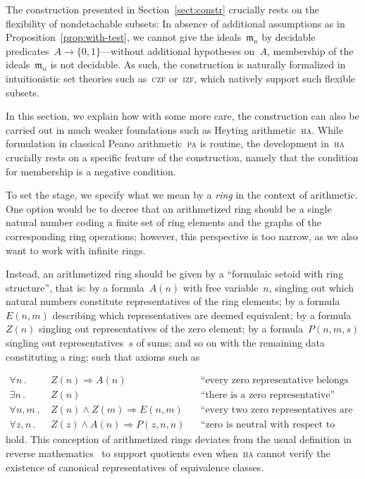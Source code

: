 \documentclass[envcountsect,envcountsame,runningheads]{llncs}
\newcommand{\mmm}{\mathfrak{m}}
\renewcommand{\_}{\mathpunct{.}\,}
\begin{document}
The construction presented in Section~\ref{sect:constr} crucially rests on the
flexibility of nondetachable subsets: In absence of additional
assumptions as in Proposition~\ref{prop:with-test},
we cannot give the ideals~$\mmm_n$ by decidable
predicates~$A \to \{0,1\}$---without additional hypotheses on~$A$, membership of the
ideals~$\mmm_n$ is not decidable. As such, the construction is
naturally formalized in intuitionistic set theories such as~\textsc{czf}
or~\textsc{izf}, which natively support such flexible subsets.

In this section, we explain how with some more care, the construction can also
be carried out in much weaker foundations such as Heyting
arithmetic~\textsc{ha}. While formulation in classical Peano arithmetic~\textsc{pa}
is routine, the development in~\textsc{ha} crucially rests on a specific
feature of the construction, namely that the condition for membership is a
negative condition.

To set the stage, we specify what we mean by a \emph{ring} in the context of
arithmetic. One option would be to decree that an arithmetized ring should be a single
natural number coding a finite set of ring elements and the graphs of the
corresponding ring operations; however, this perspective is too narrow, as we
also want to work with infinite rings.

Instead, an arithmetized ring should be given by a ``formulaic setoid with ring
structure'', that is: by a formula~$A(n)$ with free
variable~$n$, singling out which natural numbers constitute
representatives of the ring elements; by a formula~$E(n,m)$ describing which
representatives are deemed equivalent; by a formula~$Z(n)$ singling out
representatives of the zero element; by a formula~$P(n,m,s)$ singling out
representatives~$s$ of sums; and so on with the remaining data constituting
a ring; such that axioms such as\par
{\vspace*{-1.2em}\small\begin{align*}
  \forall n\_ & Z(n) \Rightarrow A(n) && \text{``every zero representative belongs to the ring''} \\
  \exists n\_ & Z(n) && \text{``there is a zero representative''} \\
  \forall n,m\_ & Z(n) \wedge Z(m) \Longrightarrow E(n,m) && \text{``every two zero representatives are equivalent''} \\
  \forall z,n\_ & Z(z) \wedge A(n) \Longrightarrow P(z,n,n) && \text{``zero is neutral with respect to addition''}
\end{align*}}%
hold. This conception of arithmetized rings deviates from the usual definition
in reverse mathematics~\cite[Definition~III.5.1]{simpson:subsystems} to support
quotients even when~\textsc{ha} cannot verify the existence of
canonical representatives of equivalence classes.
\end{document}
